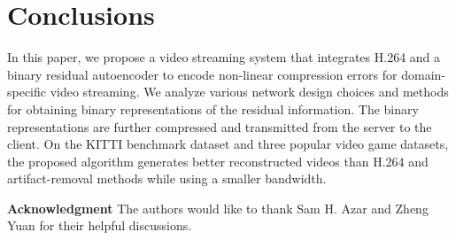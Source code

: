 \documentclass[letterpaper]{article} %
\begin{document}
	
	
	\section{Conclusions}
	In this paper, we propose a video streaming system that integrates H.264 and a binary residual autoencoder to encode non-linear compression errors for domain-specific video streaming. We analyze various network design choices and methods for obtaining binary representations of the residual information. The binary representations are further compressed and transmitted from the server to the client. On the KITTI benchmark dataset and three popular video game datasets, the proposed algorithm generates better reconstructed videos than H.264 and artifact-removal methods while using a smaller bandwidth.
	
	{\bf \noindent Acknowledgment} The authors would like to thank Sam H. Azar and Zheng Yuan for their helpful discussions.
	
	
	
\end{document}
